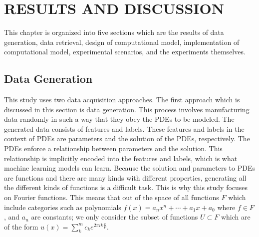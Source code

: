 \chapter{RESULTS AND DISCUSSION}\label{sec:results_and_discussion}
\noindent This chapter is organized into five sections which are the results of data generation, data retrieval, design of computational model, implementation of computational model, experimental scenarios, and the experiments themselves.

\section{Data Generation}\label{sec:data_generation}
\noindent This study uses two data acquisition approaches. The first approach which is discussed in this section is data generation. This process involves manufacturing data randomly in such a way that they obey the PDEs to be modeled. The generated data consists of features and labels. These features and labels in the context of PDEs are parameters and the solution of the PDEs, respectively. The PDEs enforce a relationship between parameters and the solution. This relationship is implicitly encoded into the features and labels, which is what machine learning models can learn. Because the solution and parameters to PDEs are functions and there are many kinds with different properties, generating all the different kinds of functions is a difficult task. This is why this study focuses on Fourier functions. This means that out of the space of all functions \(F \) which include categories such as polynomials \(f\left(x\right)=a_{n}x^n+\cdots+a_1x+a_0\) where \(f\in F\), and \(a_n\) are constants; we only consider the subset of functions \(U \subset F\) which are of the form \(u\left(x\right)=\sum_{k}^{m}c_k e^{2\pi i k \frac{x}{P}}\).

